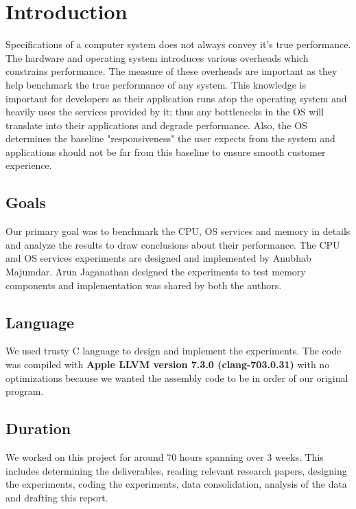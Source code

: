 \documentclass[conference]{IEEEtran}
\begin{document}
\IEEEpeerreviewmaketitle




\section{Introduction}
Specifications of a computer system does not always convey it's true performance. The hardware and operating system introduces various overheads which constrains performance. The measure of these overheads are important as they help benchmark the true performance of any system. This knowledge is important for developers as their application runs atop the operating system and heavily uses the services provided by it; thus any bottlenecks in the OS will translate into their applications and degrade performance. Also, the OS determines the baseline "responsiveness" the user expects from the system and applications should not be far from this baseline to ensure smooth customer experience. 

\subsection{Goals}
Our primary goal was to benchmark the CPU, OS services and memory in details and analyze the results to draw conclusions about their performance. The CPU and OS services experiments are designed and implemented by Anubhab Majumdar. Arun Jaganathan designed the experiments to test memory components and implementation was shared by both the authors. 

\subsection{Language}
We used trusty C language to design and implement the experiments. The code was compiled with \textbf{Apple LLVM version 7.3.0 (clang-703.0.31)} with no optimizations because we wanted the assembly code to be in order of our original program. 

\subsection{Duration}
We worked on this project for around 70 hours spanning over 3 weeks. This includes determining the deliverables, reading relevant research papers, designing the experiments, coding the experiments, data consolidation, analysis of the data and drafting this report.
\end{document}
